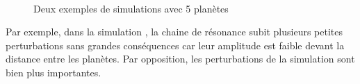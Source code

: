 
\begin{figure}[htbp]
\centering
{}\\
\caption{Deux exemples de simulations avec 5 planètes}\label{fig:timed-resonance-stability}
\end{figure}

Par exemple, dans la simulation , la chaine de  résonance subit plusieurs petites perturbations sans grandes conséquences car leur amplitude est faible devant la distance entre les planètes. Par opposition, les perturbations de la simulation   sont bien plus importantes.

